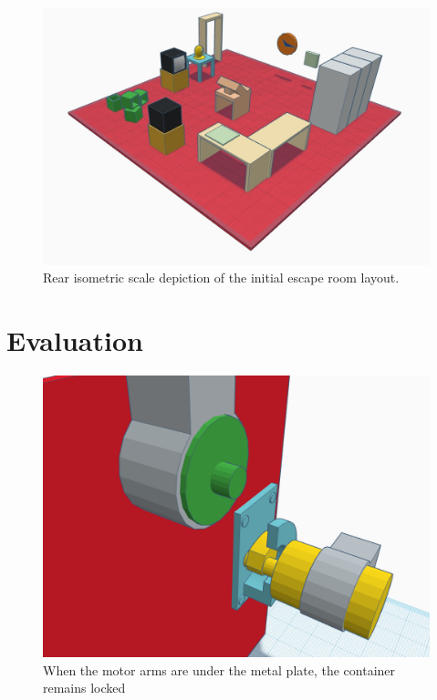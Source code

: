 \documentclass[conference]{IEEEtran}
\begin{document}
\begin{figure}[ht]
    \centering
    \includegraphics[width=0.75\columnwidth]{Images/EscapeRoomIsoRear.jpg}
    \caption{Rear isometric scale depiction of the initial escape room layout.}
\end{figure}

\section{Evaluation} %

\begin{figure}[H]
    \centering
    \includegraphics[width=0.85\columnwidth]{Images/ClosedLock.png}
    \caption{When the motor arms are under the metal plate, the container remains locked}
\end{figure}
\end{document}
